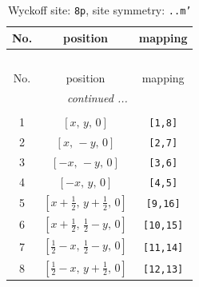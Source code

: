 \documentclass[fleqn,8pt]{jsarticle}
\begin{document}
\begin{longtable}{ccc}
\caption{Wyckoff site: {\tt 8p}, site symmetry: {\tt ..m'}}
 \\
 \hline \hline
No. & position & mapping \\ \hline \endfirsthead

\multicolumn{2}{l}{\tablename\ \thetable{}} \\
 \hline \hline
No. & position & mapping \\ \hline \endhead

 \hline \hline
\multicolumn{2}{r}{\footnotesize\it continued ...} \\ \endfoot

 \hline \hline
\multicolumn{2}{r}{} \\ \endlastfoot

1 & $\left[ x,\, y,\, 0 \right]$ & {\tt [1,8]} \\ \hline
2 & $\left[ x,\, - y,\, 0 \right]$ & {\tt [2,7]} \\ \hline
3 & $\left[ - x,\, - y,\, 0 \right]$ & {\tt [3,6]} \\ \hline
4 & $\left[ - x,\, y,\, 0 \right]$ & {\tt [4,5]} \\ \hline
5 & $\left[ x + \frac{1}{2},\, y + \frac{1}{2},\, 0 \right]$ & {\tt [9,16]} \\ \hline
6 & $\left[ x + \frac{1}{2},\, \frac{1}{2} - y,\, 0 \right]$ & {\tt [10,15]} \\ \hline
7 & $\left[ \frac{1}{2} - x,\, \frac{1}{2} - y,\, 0 \right]$ & {\tt [11,14]} \\ \hline
8 & $\left[ \frac{1}{2} - x,\, y + \frac{1}{2},\, 0 \right]$ & {\tt [12,13]} \\
\end{longtable}
\renewcommand{\arraystretch}{1.2}
\end{document}
